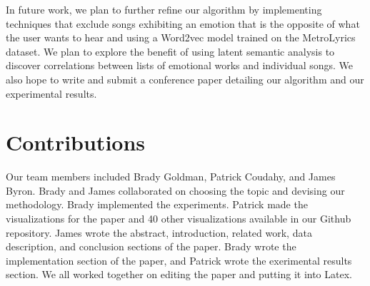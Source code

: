 \documentclass[10pt,twocolumn]{article}
\begin{document}
In future work, we plan to further refine our algorithm by implementing techniques that exclude songs exhibiting an emotion that is the opposite of what the user wants to hear and using a Word2vec model trained on the MetroLyrics dataset.  We plan to explore the benefit of using latent semantic analysis to discover correlations between lists of emotional works and individual songs.  We also hope to write and submit a conference paper detailing our algorithm and our experimental results.

\section{Contributions}
Our team members included Brady Goldman, Patrick Coudahy, and James Byron.  Brady and James collaborated on choosing the topic and devising our methodology.  Brady implemented the experiments.  Patrick made the visualizations for the paper and 40 other visualizations available in our Github repository.  James wrote the abstract, introduction, related work, data description, and conclusion sections of the paper.  Brady wrote the implementation section of the paper, and Patrick wrote the exerimental results section.  We all worked together on editing the paper and putting it into Latex.



\end{document}
